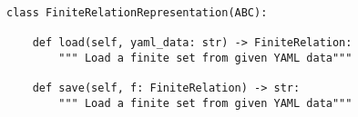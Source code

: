 \begin{verbatim}
class FiniteRelationRepresentation(ABC):

    def load(self, yaml_data: str) -> FiniteRelation:
        """ Load a finite set from given YAML data"""

    def save(self, f: FiniteRelation) -> str:
        """ Load a finite set from given YAML data"""
\end{verbatim}